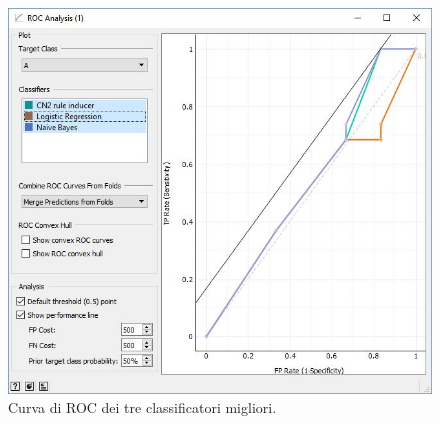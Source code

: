 \documentclass[a4paper, 12p]{report}
\begin{document}
\begin{figure}	
	\centering
	\includegraphics[scale = 0.6]{img/ROC.JPG}
	\caption{Curva di ROC dei tre classificatori migliori.}\label{fig:9}
\end{figure}
\end{document}
